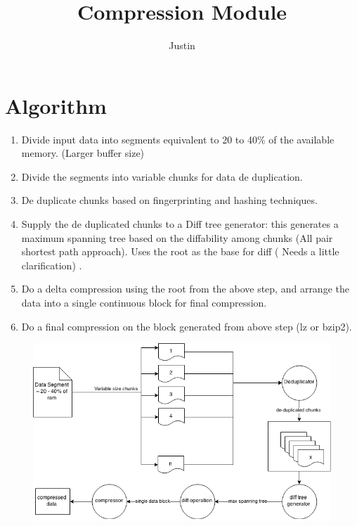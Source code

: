 \documentclass{article}
\title{Compression Module}
\author{Justin}
\date{}
\begin{document}
   \maketitle
   \section*{Algorithm}
   \begin{enumerate}  
   \item Divide input data into segments equivalent to 20 to 40\% of the available memory. (Larger buffer size)
   \item Divide the segments into variable chunks for data de duplication. 
   \item De duplicate chunks based on fingerprinting and hashing techniques.
   \item Supply the de duplicated chunks to a Diff tree generator: this generates a maximum spanning tree based on the diffability among chunks (All pair shortest path approach). Uses the root as the base for diff ( Needs a little clarification) .
   \item Do a delta compression using the root from the above step, and arrange the data into a single continuous block for final compression.
   \item Do a final compression on the block generated from above step (lz or bzip2).
\end{enumerate}  
   \begin{figure}[!th]
    \includegraphics[scale=0.5]{compressor.png}
   \end{figure}
\end{document}
